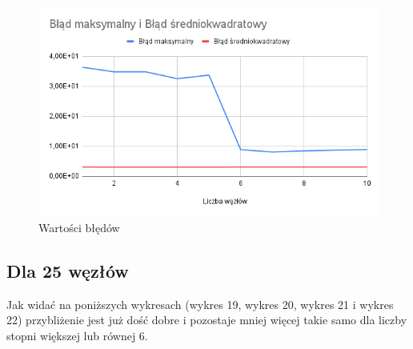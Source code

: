 \documentclass{article}
\begin{document}
\begin{figure}[H]
  \centering
  \begin{minipage}[b]{0.4\textwidth}
    \includegraphics[width=\textwidth]{img18.png}
    \caption{Wartości błędów}
  \end{minipage}
\end{figure}

\newpage

\subsection{Dla 25 węzłów}

\noindent
Jak widać na poniższych wykresach (wykres 19, wykres 20, wykres 21 i wykres 22) przybliżenie jest już dość dobre i pozostaje mniej więcej takie samo dla liczby stopni większej lub równej 6.
\end{document}
